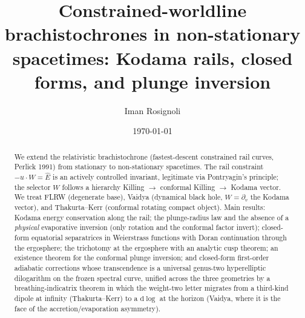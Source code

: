 \documentclass[
    aps, prd, twocolumn, superscriptaddress,
    showpacs, nofootinbib, floatfix
]{revtex4-2}
\newcommand{\Ehat}{\hat E}
\begin{document}
\title{Constrained-worldline brachistochrones in non-stationary
spacetimes: Kodama rails, closed forms, and plunge inversion}

\author{Iman Rosignoli}

\date{\today}

\begin{abstract}
We extend the relativistic brachistochrone (fastest-descent
constrained rail curves, Perlick 1991) from stationary to non-stationary
spacetimes. The rail constraint $-u\cdot W=\Ehat$ is an actively controlled
invariant, legitimate via Pontryagin's principle; the selector $W$ follows a
hierarchy Killing $\to$ conformal Killing $\to$ Kodama vector. We treat FLRW
(degenerate base), Vaidya (dynamical black hole, $W=\partial_v$ the Kodama
vector), and Thakurta--Kerr (conformal rotating compact object). Main results:
Kodama energy conservation along the rail; the plunge-radius law and the
absence of a \emph{physical} evaporative inversion (only rotation and the
conformal factor invert); closed-form equatorial separatrices in Weierstrass
functions with Doran continuation through the ergosphere; the trichotomy at
the ergosphere with an analytic cusp theorem; an existence theorem for the
conformal plunge inversion; and closed-form first-order adiabatic corrections
whose transcendence is a universal genus-two hyperelliptic dilogarithm on the
frozen spectral curve, unified across the three geometries by a
breathing-indicatrix theorem in which the weight-two letter migrates from a
third-kind dipole at infinity (Thakurta--Kerr) to a $\mathrm{d}\!\log$ at the
horizon (Vaidya, where it is the face of the accretion/evaporation asymmetry).
\end{abstract}

\maketitle

{\hypersetup{linkcolor=black}\tableofcontents}


\end{document}
